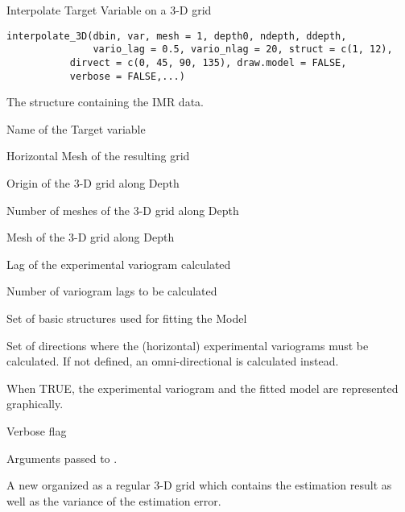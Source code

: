 %
\begin{Description}\relax
Interpolate Target Variable on a 3-D grid
\end{Description}
%
\begin{Usage}
\begin{verbatim}
interpolate_3D(dbin, var, mesh = 1, depth0, ndepth, ddepth,
               vario_lag = 0.5, vario_nlag = 20, struct = c(1, 12),
	       dirvect = c(0, 45, 90, 135), draw.model = FALSE,
	       verbose = FALSE,...)
\end{verbatim}
\end{Usage}
%
\begin{Arguments}
\begin{ldescription}
\item[\code{dbin}] 
The  structure containing the IMR data.

\item[\code{var}] 
Name of the Target variable

\item[\code{mesh}] 
Horizontal Mesh of the resulting grid

\item[\code{depth0}] 
Origin of the 3-D grid along Depth

\item[\code{ndepth}] 
Number of meshes of the 3-D grid along Depth

\item[\code{ddepth}] 
Mesh of the 3-D grid along Depth

\item[\code{vario\_lag}] 
Lag of the experimental variogram calculated

\item[\code{vario\_nlag}] 
Number of variogram lags to be calculated

\item[\code{struct}] 
Set of basic structures used for fitting the Model

\item[\code{dirvect}] 
Set of directions where the (horizontal) experimental variograms must be
calculated. If not defined, an omni-directional is calculated instead.

\item[\code{draw.model}] 
When TRUE, the experimental variogram and the fitted model are represented
graphically.

\item[\code{verbose}] 
Verbose flag

\item[\code{...}] 
Arguments passed to .

\end{ldescription}
\end{Arguments}
%
\begin{Value}
A new  organized as a regular 3-D grid which contains
the estimation result as well as the variance of the estimation error.
\end{Value}
